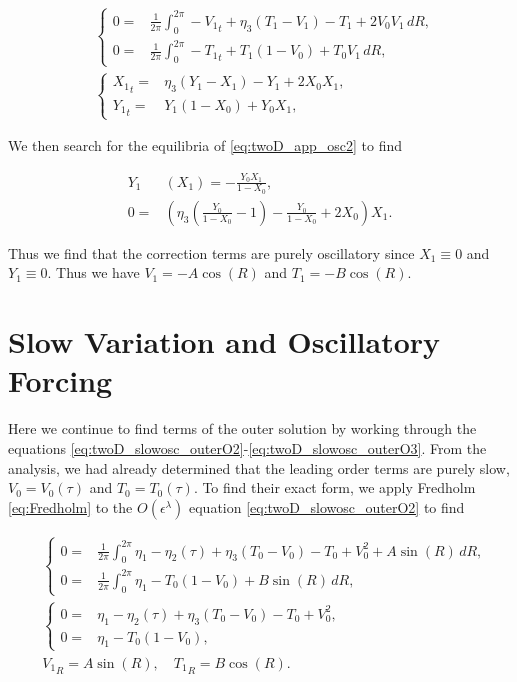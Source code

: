 \begin{equation}\label{eq:twoD_app_osc2}
\begin{aligned}
&\begin{cases}
	0 = & \frac{1}{2\pi}\int_0^{2\pi}-{V_1}_t+\eta_3(T_1-V_1)-T_1+2V_0V_1\,dR,\\
	 0 =& \frac{1}{2\pi}\int_0^{2\pi}-{T_1}_t+ T_1(1-V_0)+T_0V_1\,dR,
\end{cases}\\
&\begin{cases}
	{X_1}_t = & \eta_3(Y_1-X_1)-Y_1+2X_0X_1,\\
	 {Y_1}_t =&  Y_1(1-X_0)+Y_0X_1,
\end{cases}
\end{aligned}
\end{equation}

We then search for the equilibria of \eqref{eq:twoD_app_osc2} to find

\begin{equation*}
\begin{aligned}
Y_1&(X_1) =-\frac{Y_0X_1}{1-X_0},\\
0 =& \left(\eta_3\left(\frac{Y_0}{1-X_0}-1\right)-\frac{Y_0}{1-X_0}+2X_0\right)X_1.
\end{aligned}
\end{equation*}

Thus we find that the correction terms are purely oscillatory since $X_1\equiv 0$ and $Y_1 \equiv 0$. Thus we have $V_1=-A\cos(R)$ and $T_1=-B\cos(R)$.

\section*{Slow Variation and Oscillatory Forcing}

Here we continue to find terms of the outer solution by working through the equations \eqref{eq:twoD_slowosc_outerO2}-\eqref{eq:twoD_slowosc_outerO3}. From the analysis, we had already determined that the leading order terms are purely slow, $V_0=V_0(\tau)$ and $T_0=T_0(\tau)$. To find their exact form, we apply Fredholm \eqref{eq:Fredholm} to the $O(\epsilon^\lambda)$ equation \eqref{eq:twoD_slowosc_outerO2} to find 

\begin{equation}\label{eq:twoD_app_slowosc1}
\begin{aligned}
&\begin{cases}
	0 = & \frac{1}{2\pi}\int_0^{2\pi}\eta_1-\eta_2(\tau)+\eta_3(T_0-V_0)-T_0+V_0^2+A\sin(R)\,dR,\\
	 0 =& \frac{1}{2\pi}\int_0^{2\pi} \eta_1-T_0(1-V_0)+B\sin(R)\,dR,
\end{cases}\\
&\begin{cases}
	0 = & \eta_1-\eta_2(\tau)+\eta_3(T_0-V_0)-T_0+V_0^2,\\
	 0 =&  \eta_1-T_0(1-V_0),
\end{cases}\\
& {V_1}_R = A\sin(R),\quad {T_1}_R = B\cos(R).
\end{aligned}
\end{equation}

